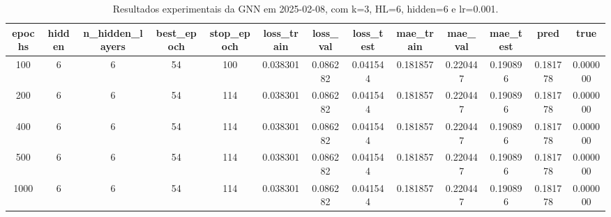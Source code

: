 \begin{table}[h]
\centering
\caption{Resultados experimentais da GNN em 2025-02-08, com k=3, HL=6, hidden=6 e lr=0.001.}
\label{tab:gnn_results_k3_hl6_h6_d20250208}
\begin{tabular}{ccccccccccccc}
\toprule
epochs & hidden & n\_hidden\_layers & best\_epoch & stop\_epoch & loss\_train & loss\_val & loss\_test & mae\_train & mae\_val & mae\_test & pred & true \\
\midrule
100 & 6 & 6 & 54 & 100 & 0.038301 & 0.086282 & 0.041544 & 0.181857 & 0.220447 & 0.190896 & 0.181778 & 0.000000 \\
200 & 6 & 6 & 54 & 114 & 0.038301 & 0.086282 & 0.041544 & 0.181857 & 0.220447 & 0.190896 & 0.181778 & 0.000000 \\
400 & 6 & 6 & 54 & 114 & 0.038301 & 0.086282 & 0.041544 & 0.181857 & 0.220447 & 0.190896 & 0.181778 & 0.000000 \\
500 & 6 & 6 & 54 & 114 & 0.038301 & 0.086282 & 0.041544 & 0.181857 & 0.220447 & 0.190896 & 0.181778 & 0.000000 \\
1000 & 6 & 6 & 54 & 114 & 0.038301 & 0.086282 & 0.041544 & 0.181857 & 0.220447 & 0.190896 & 0.181778 & 0.000000 \\
\bottomrule
\end{tabular}
\end{table}
